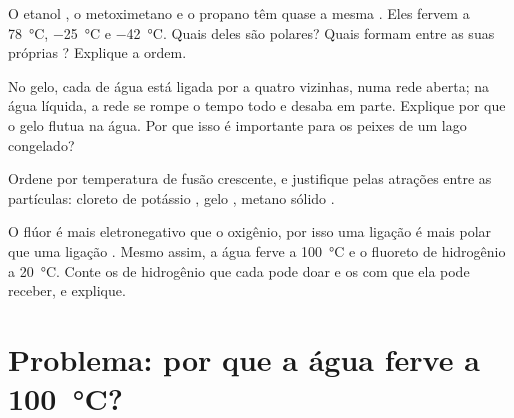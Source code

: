 \begin{exercise}[$\star\star\star$]\label{exo:g11:polarity-and-cohesion:12}
O etanol , o metoximetano  e o propano
 têm quase a mesma . Eles fervem a
\qty{78}{\celsius}, \qty{-25}{\celsius} e \qty{-42}{\celsius}. Quais
deles são polares? Quais formam  entre as suas
próprias ? Explique a ordem.
\end{exercise}

\begin{exercise}[$\star\star\star$]\label{exo:g11:polarity-and-cohesion:13}
No gelo, cada  de água está ligada por  a
quatro vizinhas, numa rede aberta; na água líquida, a rede se rompe o
tempo todo e desaba em parte. Explique por que o gelo flutua na água.
Por que isso é importante para os peixes de um lago congelado?
\end{exercise}

\begin{exercise}[$\star\star\star$]\label{exo:g11:polarity-and-cohesion:14}
Ordene por temperatura de fusão crescente, e justifique pelas atrações
entre as partículas: cloreto de potássio , gelo , metano
sólido .
\end{exercise}

\begin{exercise}[$\star\star\star$]\label{exo:g11:polarity-and-cohesion:15}
O flúor é mais eletronegativo que o oxigênio, por isso uma ligação
 é mais polar que uma ligação . Mesmo assim, a água ferve
a \qty{100}{\celsius} e o fluoreto de hidrogênio a \qty{20}{\celsius}.
Conte os  de hidrogênio que cada  pode doar e os  com que ela pode receber, e explique.
\end{exercise}

\section{Problema: por que a água ferve a \texorpdfstring{\qty{100}{\celsius}}{100 graus Celsius}?}

